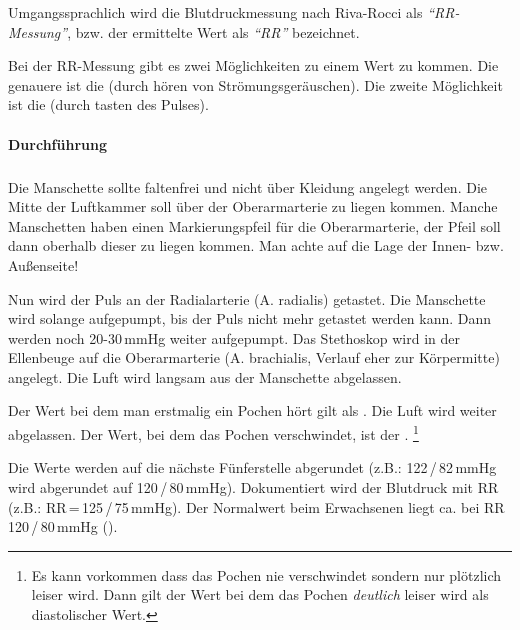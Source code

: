 
Umgangssprachlich wird die Blutdruckmessung nach Riva-Rocci als
\emph{"`RR-Messung"'}, bzw. der ermittelte Wert als \emph{"`RR"'} bezeichnet.

Bei der RR-Messung gibt es zwei Möglichkeiten zu
einem Wert zu kommen. Die genauere ist die
 (durch hören von
Strömungsgeräuschen). Die zweite Möglichkeit ist die
 (durch tasten des Pulses). 


\paragraph{Durchführung}

\subparagraph{}

Die Manschette sollte faltenfrei und nicht über Kleidung angelegt werden. Die
Mitte der Luftkammer soll über der Oberarmarterie zu liegen kommen. Manche
Manschetten haben einen Markierungspfeil für die Oberarmarterie, der Pfeil soll
dann oberhalb dieser zu liegen kommen. Man achte auf die Lage der Innen- bzw.
Außenseite!

Nun wird
der Puls an der Radialarterie (A. radialis) getastet. Die Manschette wird
solange aufgepumpt, bis der Puls nicht mehr getastet werden kann. Dann werden
noch 20-30\,mmHg weiter aufgepumpt. Das Stethoskop wird in der Ellenbeuge auf
die Oberarmarterie (A. brachialis, Verlauf eher zur Körpermitte) angelegt. Die
Luft wird langsam aus der Manschette abgelassen. 

Der Wert bei dem man
erstmalig ein Pochen  hört gilt als
. Die Luft wird weiter abgelassen. Der Wert, bei dem das
Pochen verschwindet, ist der . \footnote{Es kann
vorkommen dass das Pochen nie verschwindet sondern nur plötzlich leiser wird.
Dann gilt der Wert bei dem das Pochen \emph{deutlich} leiser wird als
diastolischer Wert.}

Die
Werte werden auf die nächste Fünferstelle abgerundet (z.B.:
122\,/\,82\,mmHg wird abgerundet auf 120\,/\,80\,mmHg). Dokumentiert
wird der Blutdruck mit RR (z.B.: RR\,=\,125\,/\,75\,mmHg). Der
Normalwert beim Erwachsenen liegt ca. bei RR 120\,/\,80\,mmHg
().


